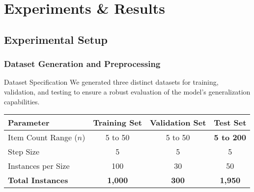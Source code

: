 \section{Experiments \& Results}

\subsection{Experimental Setup}

\begin{frame}
    \frametitle{Dataset Generation and Preprocessing}

    \begin{block}{Dataset Specification}
        We generated three distinct datasets for training, validation, and testing to ensure a robust evaluation of the model's generalization capabilities.
        
        \vspace{1em}
        \centering %
        \begin{tabular}{l c c c}
        \toprule
        \textbf{Parameter} & \textbf{Training Set} & \textbf{Validation Set} & \textbf{Test Set} \\
        \midrule
        Item Count Range ($n$) & 5 to 50 & 5 to 50 & \textbf{5 to 200} \\
        Step Size & 5 & 5 & 5 \\
        Instances per Size & 100 & 30 & 50 \\
        \addlinespace
        \textbf{Total Instances} & \textbf{1,000} & \textbf{300} & \textbf{1,950} \\
        \bottomrule
        \end{tabular}
    \end{block}
    

\end{frame}
